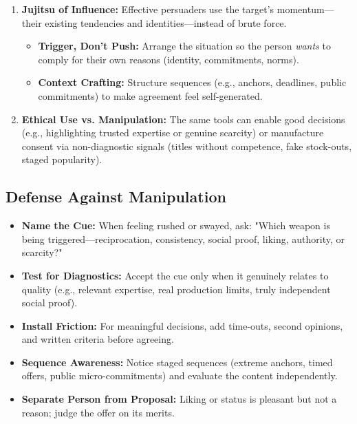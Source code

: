 \begin{enumerate}
    \item \textbf{Jujitsu of Influence:} Effective persuaders use the target’s momentum—their existing tendencies and identities—instead of brute force.
    \begin{itemize}
        \item \textbf{Trigger, Don’t Push:} Arrange the situation so the person \emph{wants} to comply for their own reasons (identity, commitments, norms).
        \item \textbf{Context Crafting:} Structure sequences (e.g., anchors, deadlines, public commitments) to make agreement feel self-generated.
    \end{itemize}

    \item \textbf{Ethical Use vs. Manipulation:} The same tools can enable good decisions (e.g., highlighting trusted expertise or genuine scarcity) or manufacture consent via non-diagnostic signals (titles without competence, fake stock-outs, staged popularity).
\end{enumerate}

\subsection*{Defense Against Manipulation}
\begin{itemize}
    \item \textbf{Name the Cue:} When feeling rushed or swayed, ask: "Which weapon is being triggered—reciprocation, consistency, social proof, liking, authority, or scarcity?"
    \item \textbf{Test for Diagnostics:} Accept the cue only when it genuinely relates to quality (e.g., relevant expertise, real production limits, truly independent social proof).
    \item \textbf{Install Friction:} For meaningful decisions, add time-outs, second opinions, and written criteria before agreeing.
    \item \textbf{Sequence Awareness:} Notice staged sequences (extreme anchors, timed offers, public micro-commitments) and evaluate the content independently.
    \item \textbf{Separate Person from Proposal:} Liking or status is pleasant but not a reason; judge the offer on its merits.
\end{itemize}

